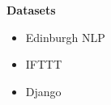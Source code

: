 \textbf{Datasets}
\begin{itemize}
    \item Edinburgh NLP
    \item IFTTT
    \item Django 
\end{itemize}







